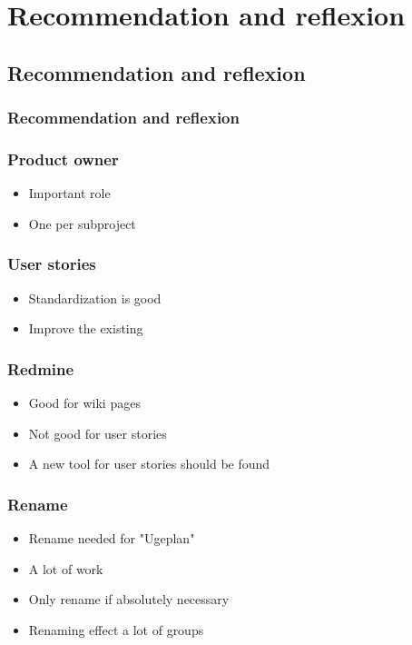 \section{Recommendation and reflexion}
\subsection{Recommendation and reflexion}
\begin{frame}
	\frametitle{Recommendation and reflexion}
\end{frame}

\begin{frame}
	\frametitle{Product owner}
	\begin{itemize}
		\item Important role
		\item One per subproject
	\end{itemize}
\end{frame}

\begin{frame}
	\frametitle{User stories}
	\begin{itemize}
		\item Standardization is good
		\item Improve the existing
	\end{itemize}
\end{frame}

\begin{frame}
	\frametitle{Redmine}
	\begin{itemize}
		\item Good for wiki pages
		\item Not good for user stories
		\item A new tool for user stories should be found
	\end{itemize}
\end{frame}

\begin{frame}
	\frametitle{Rename}
	\begin{itemize}
		\item Rename needed for "Ugeplan"
		\item A lot of work
		\item Only rename if absolutely necessary
		\item Renaming effect a lot of groups
	\end{itemize}
\end{frame}

